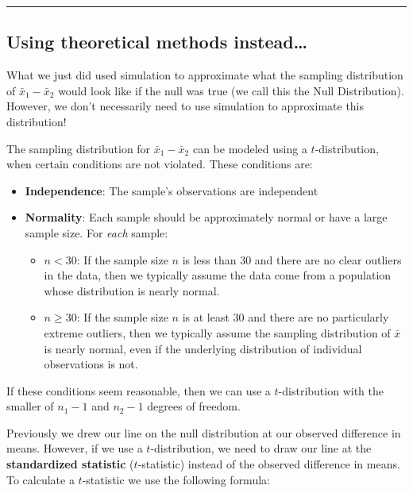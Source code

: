 \documentclass[
  letterpaper,
  DIV=11,
  numbers=noendperiod]{scrartcl}
\begin{document}
\vspace{0.2in}

\begin{center}\rule{0.5\linewidth}{0.5pt}\end{center}

\hypertarget{using-theoretical-methods-instead}{%
\subsection{Using theoretical methods
instead\ldots{}}\label{using-theoretical-methods-instead}}

What we just did used simulation to approximate what the sampling
distribution of \(\bar{x}_1-\bar{x}_2\) would look like if the null was
true (we call this the Null Distribution). However, we don't necessarily
need to use simulation to approximate this distribution!

The sampling distribution for \(\bar{x}_1-\bar{x}_2\) can be modeled
using a \(t\)-distribution, when certain conditions are not violated.
These conditions are:

\begin{itemize}
\item
  \textbf{Independence}: The sample's observations are independent
\item
  \textbf{Normality}: Each sample should be approximately normal or have
  a large sample size. For \emph{each} sample:

  \begin{itemize}
  \item
    \(n < 30\): If the sample size \(n\) is less than 30 and there are
    no clear outliers in the data, then we typically assume the data
    come from a population whose distribution is nearly normal.
  \item
    \(n \ge 30\): If the sample size \(n\) is at least 30 and there are
    no particularly extreme outliers, then we typically assume the
    sampling distribution of \(\bar{x}\) is nearly normal, even if the
    underlying distribution of individual observations is not.
  \end{itemize}
\end{itemize}

If these conditions seem reasonable, then we can use a
\(t\)-distribution with the smaller of \(n_1 - 1\) and \(n_2 - 1\)
degrees of freedom.

\vspace{0.2cm}

Previously we drew our line on the null distribution at our observed
difference in means. However, if we use a \(t\)-distribution, we need to
draw our line at the \textbf{standardized statistic} (\(t\)-statistic)
instead of the observed difference in means. To calculate a
\(t\)-statistic we use the following formula:
\end{document}
